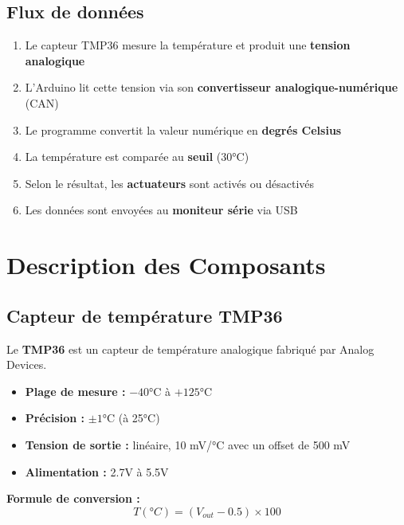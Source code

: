 \documentclass[12pt, a4paper]{article}
\begin{document}
\subsection{Flux de données}

\begin{enumerate}
    \item Le capteur TMP36 mesure la température et produit une \textbf{tension analogique}
    \item L'Arduino lit cette tension via son \textbf{convertisseur analogique-numérique} (CAN)
    \item Le programme convertit la valeur numérique en \textbf{degrés Celsius}
    \item La température est comparée au \textbf{seuil} (30°C)
    \item Selon le résultat, les \textbf{actuateurs} sont activés ou désactivés
    \item Les données sont envoyées au \textbf{moniteur série} via USB
\end{enumerate}

\section{Description des Composants}

\subsection{Capteur de température TMP36}

Le \textbf{TMP36} est un capteur de température analogique fabriqué par Analog Devices.

\begin{itemize}
    \item \textbf{Plage de mesure :} $-40$°C à $+125$°C
    \item \textbf{Précision :} $\pm 1$°C (à 25°C)
    \item \textbf{Tension de sortie :} linéaire, 10 mV/°C avec un offset de 500 mV
    \item \textbf{Alimentation :} 2.7V à 5.5V
\end{itemize}

\textbf{Formule de conversion :}
\begin{equation}
    T(°C) = (V_{out} - 0.5) \times 100
\end{equation}
\end{document}
